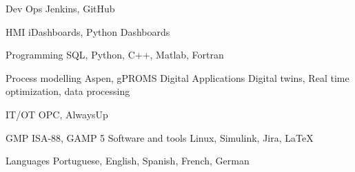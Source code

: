 

\begin{cvskills}

  \cvskill
    {Dev Ops} %
    {Jenkins, GitHub} %


  \cvskill
    {HMI} %
    {iDashboards, Python Dashboards} %

  \cvskill
    {Programming} %
    {SQL, Python, C++, Matlab, Fortran} %

  \cvskill
    {Process modelling} %
    {Aspen, gPROMS} %
  \cvskill
    {Digital Applications} %
    {Digital twins, Real time optimization, data processing} %

  \cvskill
    {IT/OT} %
    {OPC, AlwaysUp} %

  \cvskill
    {GMP} %
    {ISA-88, GAMP 5} %
  \cvskill
    {Software and tools} %
    {Linux, Simulink, Jira, LaTeX} %


  \cvskill
    {Languages} %
    {Portuguese, English, Spanish, French, German} %

\end{cvskills}
